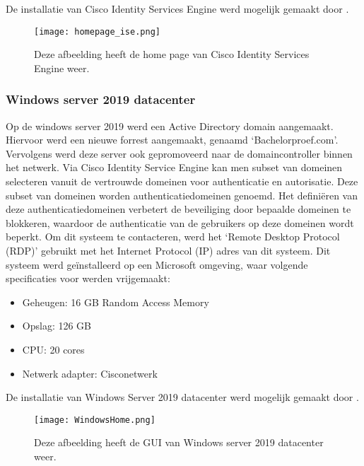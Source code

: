 De installatie van Cisco Identity Services Engine werd mogelijk gemaakt door \cite{CiscoISE_InstallationGuide}.

\begin{figure}[H]
	\centering
	\texttt{[image: homepage\_ise.png]}
	\caption{Deze afbeelding heeft de home page van Cisco Identity Services Engine weer.}
\end{figure}

\subsubsection{Windows server 2019 datacenter}
Op de windows server 2019 werd een Active Directory domain aangemaakt. Hiervoor werd een nieuwe forrest aangemaakt, genaamd ‘Bachelorproef.com’. Vervolgens werd deze server ook gepromoveerd naar de domaincontroller binnen het netwerk.
\newline
\newline
Via Cisco Identity Service Engine kan men subset van domeinen selecteren vanuit de vertrouwde domeinen voor authenticatie en autorisatie. Deze subset van domeinen worden authenticatiedomeinen genoemd. Het definiëren van deze authenticatiedomeinen verbetert de beveiliging door bepaalde domeinen te blokkeren, waardoor de authenticatie van de gebruikers op deze domeinen wordt beperkt.
\newline
\newline
Om dit systeem te contacteren, werd het ‘Remote Desktop Protocol (RDP)’ gebruikt met het Internet Protocol (IP) adres van dit systeem.
\newline
\newline
Dit systeem werd geïnstalleerd op een Microsoft omgeving, waar volgende specificaties voor werden vrijgemaakt:

\begin{itemize}
	\item Geheugen: 16 GB Random Access Memory
	\item Opslag: 126 GB
	\item CPU: 20 cores
	\item Netwerk adapter: Cisco\textunderscore netwerk
\end{itemize}
De installatie van Windows Server 2019 datacenter werd mogelijk gemaakt door \cite{Win19_InstallationGuide}. 

\begin{figure}[H]
	\centering
	\texttt{[image: WindowsHome.png]}
	\caption{Deze afbeelding heeft de GUI van Windows server 2019 datacenter weer. }
\end{figure}

